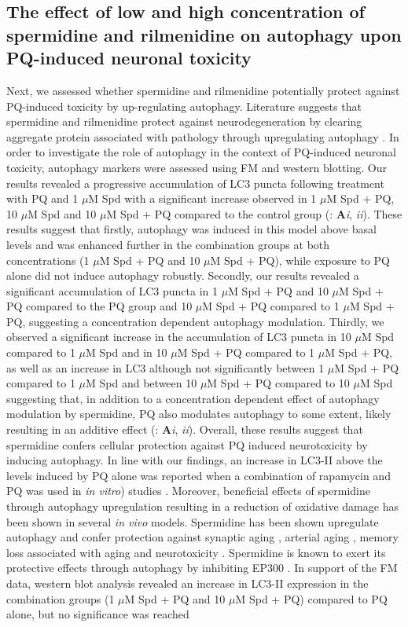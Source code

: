 \subsection{The effect of low and high concentration of spermidine and rilmenidine on autophagy upon PQ-induced neuronal toxicity}
Next, we assessed whether spermidine and rilmenidine potentially protect against PQ-induced toxicity by up-regulating autophagy. Literature suggests that spermidine and rilmenidine protect against neurodegeneration by clearing aggregate protein associated with pathology through upregulating autophagy \citep{Buttner2014,Rose2010}. In order to investigate the role of autophagy in the context of PQ-induced neuronal toxicity, autophagy markers were assessed using FM and western blotting. Our results revealed a progressive accumulation of LC3 puncta following treatment with PQ and 1 $\mu$M Spd with a significant increase observed in 1 $\mu$M Spd + PQ, 10 $\mu$M Spd and 10 $\mu$M Spd + PQ compared to the control group (: \textbf{A}\textit{i}, \textit{ii}). These results suggest that firstly, autophagy was induced in this model above basal levels and was enhanced further in the combination groups at both concentrations (1 $\mu$M Spd + PQ and 10 $\mu$M Spd + PQ), while exposure to PQ alone did not induce autophagy robustly. Secondly, our results revealed a significant accumulation of LC3 puncta in 1 $\mu$M Spd + PQ and 10 $\mu$M Spd + PQ compared to the PQ group and 10 $\mu$M Spd + PQ compared to 1 $\mu$M Spd + PQ, suggesting a concentration dependent autophagy modulation. Thirdly, we observed a significant increase in the accumulation of LC3 puncta in 10 $\mu$M Spd compared to 1 $\mu$M Spd and in 10 $\mu$M Spd + PQ compared to 1 $\mu$M Spd + PQ, as well as an increase in LC3 although not significantly between 1 $\mu$M Spd + PQ compared to 1 $\mu$M Spd  and between 10 $\mu$M Spd + PQ compared to 10 $\mu$M Spd suggesting that, in addition to a concentration dependent effect of autophagy modulation by spermidine, PQ also modulates autophagy to some extent, likely resulting in an additive effect (: \textbf{A}\textit{i}, \textit{ii}). Overall, these results suggest that spermidine confers cellular protection against PQ induced neurotoxicity by inducing autophagy. In line with our findings, an increase in LC3-II above the levels induced by PQ alone was reported when a combination of rapamycin and PQ was used in \textit{in vitro}) studies \citep{Gonzalez-Polo2007a}. Moreover, beneficial effects of spermidine through autophagy upregulation resulting in a reduction of oxidative damage has been shown in several  \textit{in vivo} models. Spermidine has been shown upregulate autophagy and confer protection against synaptic aging \citep{Bhukel2017}, arterial aging \citep{LaRocca2013}, memory loss associated with aging \citep{Gupta2013,Sigrist2014,Wirth2018} and neurotoxicity \citep{Buttner2014,Yang2017}. Spermidine is known to exert its protective effects through autophagy by inhibiting EP300 \citep{Pietrocola2015}. In support of the FM data, western blot analysis revealed an increase in LC3-II expression in the combination groups (1 $\mu$M Spd + PQ and 10 $\mu$M Spd + PQ) compared to PQ alone, but no significance was reached  